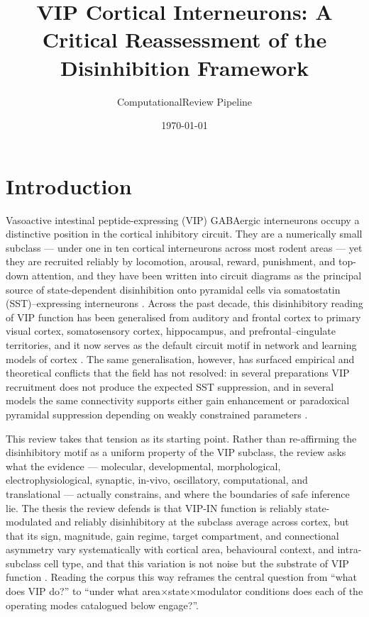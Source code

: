 \documentclass[11pt]{article}
\title{VIP Cortical Interneurons: A Critical Reassessment of the Disinhibition Framework}
\author{ComputationalReview Pipeline}
\date{\today}
\begin{document}
\maketitle
\tableofcontents
\newpage


\section{Introduction}
\label{sec:01_introduction}

Vasoactive intestinal peptide-expressing (VIP) GABAergic interneurons occupy a distinctive position in the cortical inhibitory circuit. They are a numerically small subclass --- under one in ten cortical interneurons across most rodent areas --- yet they are recruited reliably by locomotion, arousal, reward, punishment, and top-down attention, and they have been written into circuit diagrams as the principal source of state-dependent disinhibition onto pyramidal cells via somatostatin (SST)--expressing interneurons \citep{Pi2013, Lee2013, Pfeffer2013, Fu2014, Karnani2016a, Tremblay2016}. Across the past decade, this disinhibitory reading of VIP function has been generalised from auditory and frontal cortex to primary visual cortex, somatosensory cortex, hippocampus, and prefrontal--cingulate territories, and it now serves as the default circuit motif in network and learning models of cortex \citep{Fu2014, Lee2013, Kuchibhotla2017, Williams2019, Hertag2019, Litwinkumar2016, Garciadelmolino2017}. The same generalisation, however, has surfaced empirical and theoretical conflicts that the field has not resolved: in several preparations VIP recruitment does not produce the expected SST suppression, and in several models the same connectivity supports either gain enhancement or paradoxical pyramidal suppression depending on weakly constrained parameters \citep{Pakan2016, Dipoppa2018, Yavorska2021, Garciadelmolino2017, Sanzeni2020}.

This review takes that tension as its starting point. Rather than re-affirming the disinhibitory motif as a uniform property of the VIP subclass, the review asks what the evidence --- molecular, developmental, morphological, electrophysiological, synaptic, in-vivo, oscillatory, computational, and translational --- actually constrains, and where the boundaries of safe inference lie. The thesis the review defends is that VIP-IN function is reliably state-modulated and reliably disinhibitory at the subclass average across cortex, but that its sign, magnitude, gain regime, target compartment, and connectional asymmetry vary systematically with cortical area, behavioural context, and intra-subclass cell type, and that this variation is not noise but the substrate of VIP function \citep{Pi2013, Pfeffer2013, Fu2014, Pakan2016, Dipoppa2018, Garrett2020, Bigelow2019, Anastasiades2021a, Bastos2023a}. Reading the corpus this way reframes the central question from ``what does VIP do?'' to ``under what area$\times$state$\times$modulator conditions does each of the operating modes catalogued below engage?''.
\end{document}
